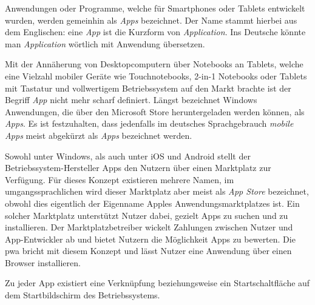 Anwendungen oder Programme, welche für Smartphones oder Tablets entwickelt wurden, werden gemeinhin als \textit{Apps} bezeichnet. Der Name stammt hierbei aus dem Englischen: eine \textit{App} ist die Kurzform von \textit{Application}. Ins Deutsche könnte man \textit{Application} wörtlich mit Anwendung übersetzen.

Mit der Annäherung von Desktopcomputern über Notebooks an Tablets, welche eine Vielzahl mobiler Geräte wie Touchnotebooks, 2-in-1 Notebooks oder Tablets mit Tastatur und vollwertigem Betriebssystem auf den Markt brachte ist der Begriff \textit{App} nicht mehr scharf definiert.
Längst bezeichnet Windows Anwendungen, die über den Microsoft Store heruntergeladen werden können, als \textit{Apps}. Es ist festzuhalten, dass jedenfalls im deutsches Sprachgebrauch \textit{mobile Apps} meist abgekürzt als \textit{Apps} bezeichnet werden.

Sowohl unter Windows, als auch unter iOS und Android stellt der Betriebssystem-Hersteller Apps den Nutzern über einen Marktplatz zur Verfügung. Für dieses Konzept existieren mehrere Namen, im umgangssprachlichen wird dieser Marktplatz aber meist als \textit{App Store} bezeichnet, obwohl dies eigentlich der Eigenname Apples Anwendungsmarktplatzes ist. 
Ein solcher Marktplatz unterstützt Nutzer dabei, gezielt Apps zu suchen und zu installieren. Der Marktplatzbetreiber wickelt Zahlungen zwischen Nutzer und App-Entwickler ab und bietet Nutzern die Möglichkeit Apps zu bewerten. 
Die \acf{pwa} bricht mit diesem Konzept und lässt Nutzer eine Anwendung über einen Browser installieren. 

Zu jeder App existiert eine Verknüpfung beziehungsweise ein Startschaltfläche auf dem Startbildschirm des Betriebssystems.